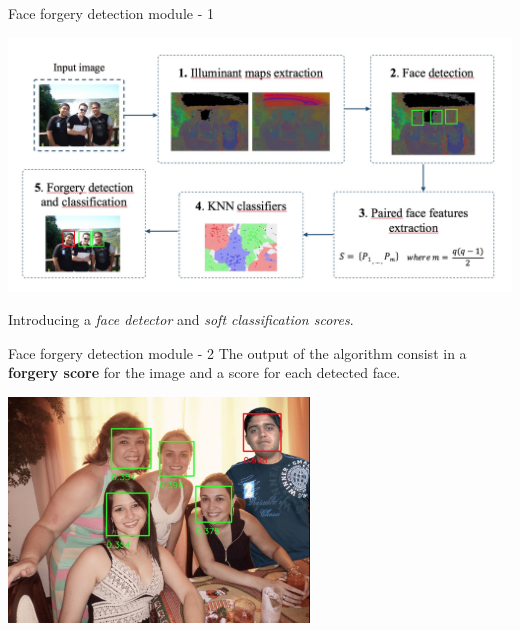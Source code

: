 \begin{tframe}{Face forgery detection module - 1}

\begin{center}
\includegraphics[width=1\textwidth]{images/pipeline_faces.jpg}
\end{center}
Introducing a \emph{face detector} and \emph{soft classification scores}.
\end{tframe}


\begin{tframe}{Face forgery detection module - 2}
\vspace{0.1cm}
The output of the algorithm consist in a \textbf{forgery score} for the image and a score for each detected face.

\vspace{0.2cm}
\begin{center}
\includegraphics[width=0.6\textwidth]{images/facedetectionoutput.jpg}
\end{center}
\end{tframe}


